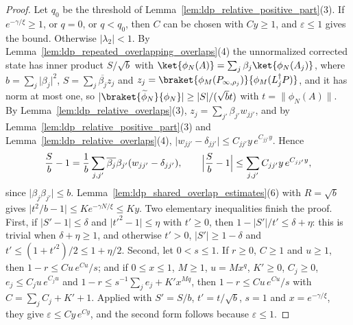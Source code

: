 \begin{proof}
    \leanok
    Let $q_0$ be the threshold of Lemma~\ref{lem:ldp_relative_positive_part}(3). If
    $e^{-\gamma/\xi}\geq1$, or $q=0$, or $q<q_0$, then $C$ can be chosen with $Cy\geq1$, and
    $\varepsilon\leq1$ gives the bound. Otherwise $\lvert\lambda_2\rvert<1$. By
    Lemma~\ref{lem:ldp_repeated_overlapping_overlaps}(4) the unnormalized corrected state
    has inner product $S/\sqrt b$ with $\ket{\phi_N(A)}=\sum_j\beta_j\ket{\phi_N(A_j)}$,
    where $b=\sum_j\lvert\beta_j\rvert^2$, $S=\sum_j\overline{\beta_j}z_j$ and
    $z_j=\braket{\phi_M(P_{\infty,\rho_j})}{\phi_M(L_j^\dagger P)}$, and it has norm at most
    one, so $\lvert\braket{\widetilde\phi_N}{\phi_N}\rvert\geq\lvert S\rvert/(\sqrt bt)$ with
    $t=\lVert\phi_N(A)\rVert$. By Lemma~\ref{lem:ldp_relative_overlaps}(3),
    $z_j=\sum_{j'}\beta_{j'}w_{jj'}$, and by Lemma~\ref{lem:ldp_relative_positive_part}(3)
    and Lemma~\ref{lem:ldp_relative_overlaps}(4),
    $\lvert w_{jj'}-\delta_{jj'}\rvert\leq C_{jj'}y\,e^{C_{jj'}y}$. Hence
    \begin{align*}
        \frac Sb-1=\frac1b\sum_{j,j'}\overline{\beta_j}\beta_{j'}(w_{jj'}-\delta_{jj'}),
        \qquad
        \Bigl\lvert\frac Sb-1\Bigr\rvert\leq\sum_{j,j'}C_{jj'}y\,e^{C_{jj'}y},
    \end{align*}
    since $\lvert\beta_j\beta_{j'}\rvert\leq b$. Lemma~\ref{lem:ldp_shared_overlap_estimates}(6)
    with $R=\sqrt b$ gives $\lvert t^2/b-1\rvert\leq Ke^{-\gamma N/\xi}\leq Ky$.
    Two elementary inequalities finish the proof. First, if $\lvert S'-1\rvert\leq\delta$ and
    $\lvert t'^2-1\rvert\leq\eta$ with $t'\geq0$, then
    $1-\lvert S'\rvert/t'\leq\delta+\eta$: this is trivial when $\delta+\eta\geq1$, and
    otherwise $t'>0$, $\lvert S'\rvert\geq1-\delta$ and $t'\leq(1+t'^2)/2\leq1+\eta/2$.
    Second, let $0<s\leq1$. If $r\geq0$, $C\geq1$ and $u\geq1$, then
    $1-r\leq Cu\,e^{Cu}/s$; and if $0\leq x\leq1$, $M\geq1$, $u=Mx^q$, $K'\geq0$,
    $C_j\geq0$, $e_j\leq C_ju\,e^{C_ju}$ and $1-r\leq s^{-1}\sum_je_j+K'x^{Mq}$, then
    $1-r\leq Cu\,e^{Cu}/s$ with $C=\sum_jC_j+K'+1$. Applied with $S'=S/b$,
    $t'=t/\sqrt b$, $s=1$ and $x=e^{-\gamma/\xi}$, they give $\varepsilon\leq Cy\,e^{Cy}$,
    and the second form follows because $\varepsilon\leq1$.
\end{proof}

